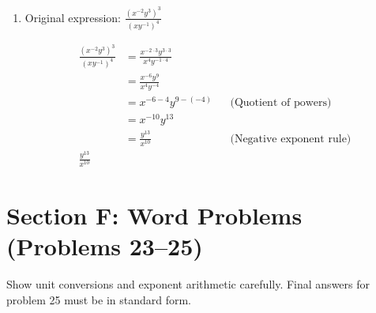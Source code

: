 \documentclass{article}
\begin{document}
\begin{enumerate}
\begin{align*}
\left(\frac{a^{-1} b^2}{a^3 b^{-4}}\right)^{-2} &= \left(a^{-1 - 3} b^{2 - (-4)}\right)^{-2} && \text{(Quotient of powers)} \\
&= \left(a^{-4} b^{6}\right)^{-2} \\
&= a^{-4 \cdot (-2)} b^{6 \cdot (-2)} && \text{(Power of a power)} \\
&= a^{8} b^{-12} \\
&= \frac{a^{8}}{b^{12}} && \text{(Negative exponent rule)} \\
\boxed{\frac{a^{8}}{b^{12}}}
\end{align*}

\item
Original expression: \quad $\frac{(x^{-2} y^3)^3}{(x y^{-1})^4}$

\begin{align*}
\frac{(x^{-2} y^3)^3}{(x y^{-1})^4} &= \frac{x^{-2 \cdot 3} y^{3 \cdot 3}}{x^{4} y^{-1 \cdot 4}} \\
&= \frac{x^{-6} y^{9}}{x^{4} y^{-4}} \\
&= x^{-6 - 4} y^{9 - (-4)} && \text{(Quotient of powers)} \\
&= x^{-10} y^{13} \\
&= \frac{y^{13}}{x^{10}} && \text{(Negative exponent rule)} \\
\boxed{\frac{y^{13}}{x^{10}}}
\end{align*}
\end{enumerate}

\section*{Section F: Word Problems (Problems 23--25)} 
Show unit conversions and exponent arithmetic carefully. Final answers for problem 25 must be in standard form.
\end{document}
